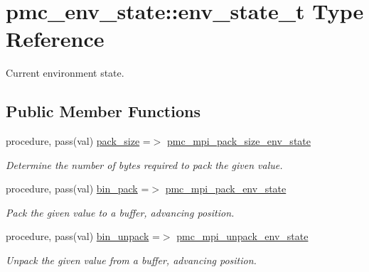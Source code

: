 \hypertarget{structpmc__env__state_1_1env__state__t}{}\section{pmc\+\_\+env\+\_\+state\+:\+:env\+\_\+state\+\_\+t Type Reference}
\label{structpmc__env__state_1_1env__state__t}


Current environment state.  


\subsection*{Public Member Functions}
\begin{DoxyCompactItemize}
\item 
procedure, pass(val) \mbox{\hyperlink{structpmc__env__state_1_1env__state__t_a696251e798ed0c73947785d47eb284cd}{pack\+\_\+size}} =$>$ \mbox{\hyperlink{namespacepmc__env__state_ade49d8dfe1865485f6648200824a8aa2}{pmc\+\_\+mpi\+\_\+pack\+\_\+size\+\_\+env\+\_\+state}}
\begin{DoxyCompactList}\small\item\em Determine the number of bytes required to pack the given value. \end{DoxyCompactList}\item 
procedure, pass(val) \mbox{\hyperlink{structpmc__env__state_1_1env__state__t_a94f7db1f715b391a610346f2e1b024e2}{bin\+\_\+pack}} =$>$ \mbox{\hyperlink{namespacepmc__env__state_a480b54f036d88d6640bf278ce8677987}{pmc\+\_\+mpi\+\_\+pack\+\_\+env\+\_\+state}}
\begin{DoxyCompactList}\small\item\em Pack the given value to a buffer, advancing position. \end{DoxyCompactList}\item 
procedure, pass(val) \mbox{\hyperlink{structpmc__env__state_1_1env__state__t_aa303dff5aff68191d508bbb757772c2c}{bin\+\_\+unpack}} =$>$ \mbox{\hyperlink{namespacepmc__env__state_a29321768e4beec8bedc30f795b89a945}{pmc\+\_\+mpi\+\_\+unpack\+\_\+env\+\_\+state}}
\begin{DoxyCompactList}\small\item\em Unpack the given value from a buffer, advancing position. \end{DoxyCompactList}\end{DoxyCompactItemize}
